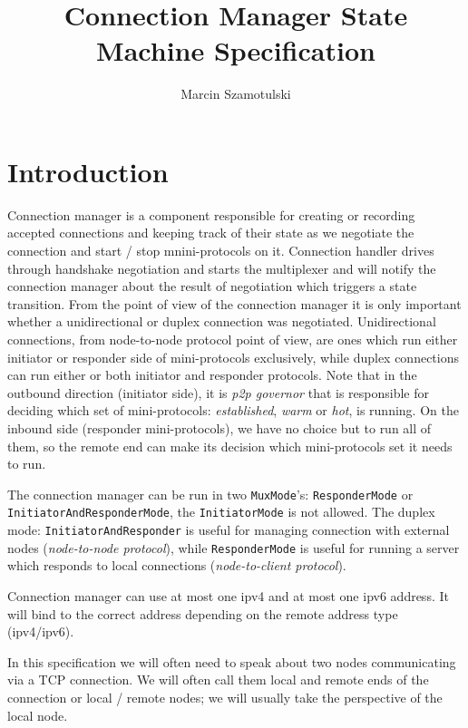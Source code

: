 \documentclass{article}
\title{Connection Manager State Machine Specification}
\author{Marcin Szamotulski}
\def\TCP{\textsf{TCP}}
\def\ipvfour{\textsf{ipv4}}
\def\ipvsix{\textsf{ipv6}}
\def\warm{\textit{warm}}
\def\hot{\textit{hot}}
\def\established{\textit{established}}
\def\ptopgov{\textit{p2p governor}}
\begin{document}
\maketitle

\section{Introduction}
Connection manager is a component responsible for creating or recording
accepted connections and keeping track of their state as we negotiate the
connection and start / stop mnini-protocols on it.  Connection handler drives
through handshake negotiation and starts the multiplexer and will notify the
connection manager about the result of negotiation which triggers a state
transition.  From the point of view of the connection manager it is only
important whether a unidirectional or duplex connection was negotiated.
Unidirectional connections, from node-to-node protocol point of view, are ones
which run either initiator or responder side of mini-protocols exclusively,
while duplex connections can run either or both initiator and responder
protocols.  Note that in the outbound direction (initiator side), it is
\ptopgov{} that is responsible for deciding which set of mini-protocols:
\established{}, \warm{} or \hot{}, is running.  On the inbound side (responder
mini-protocols), we have no choice but to run all of them, so the remote end
can make its decision which mini-protocols set it needs to run.

The connection manager can be run in two \texttt{MuxMode}'s:
\texttt{ResponderMode} or \texttt{InitiatorAndResponderMode}, the
\texttt{InitiatorMode} is not allowed.  The duplex mode:
\texttt{InitiatorAndResponder} is useful for managing connection with external
nodes (\textit{node-to-node protocol}), while \texttt{ResponderMode} is useful
for running a server which responds to local connections
(\textit{node-to-client protocol}).

Connection manager can use at most one \ipvfour{} and at most one \ipvsix{}
address.  It will bind to the correct address depending on the remote address
type (\ipvfour{}/\ipvsix{}).

In this specification we will often need to speak about two nodes communicating
via a \TCP{} connection.  We will often call them local and remote ends of the
connection or local \slash{} remote nodes; we will usually take the
perspective of the local node.
\end{document}
